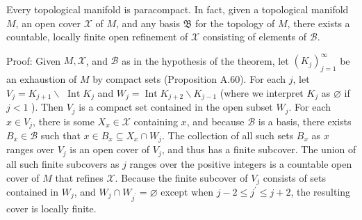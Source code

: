 \documentclass[12pt, oneside]{book}
\begin{document}
\begin{theorem}[Paracompact]
    Every topological manifold is paracompact. In fact, given a topological manifold $M$, an open cover $\mathcal{X}$ of $M$, and any basis $\mathfrak{B}$ for the topology of $M$, there exists a countable, locally finite open refinement of $\mathcal{X}$ consisting of elements of $\mathcal{B}$.

    Proof:
    Given $M, \mathcal{X}$, and $\mathcal{B}$ as in the hypothesis of the theorem, let $\left(K_j\right)_{j=1}^{\infty}$ be an exhaustion of $M$ by compact sets (Proposition A.60). For each $j$, let $V_j=K_{j+1} \backslash$ $\operatorname{Int} K_j$ and $W_j=\operatorname{Int} K_{j+2} \backslash K_{j-1}$ (where we interpret $K_j$ as $\varnothing$ if $j<1$ ). Then $V_j$ is a compact set contained in the open subset $W_j$. For each $x \in V_j$, there is some $X_x \in \mathcal{X}$ containing $x$, and because $\mathcal{B}$ is a basis, there exists $B_x \in \mathcal{B}$ such that $x \in B_x \subseteq X_x \cap W_j$. The collection of all such sets $B_x$ as $x$ ranges over $V_j$ is an open cover of $V_j$, and thus has a finite subcover. The union of all such finite subcovers as $j$ ranges over the positive integers is a countable open cover of $M$ that refines $\mathcal{X}$. Because the finite subcover of $V_j$ consists of sets contained in $W_j$, and $W_j \cap W_{j^{\prime}}=\varnothing$ except when $j-2 \leq j^{\prime} \leq j+2$, the resulting cover is locally finite.
\end{theorem}
\end{document}

